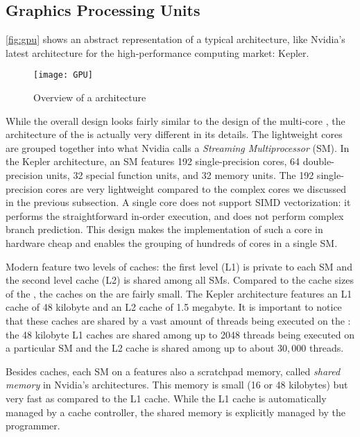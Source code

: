 \subsection[Graphics Processing Units (GPUs)]{Graphics Processing Units}
\autoref{fig:gpu} shows an abstract representation of a typical \GPU architecture, like Nvidia's latest \GPU architecture for the high-performance computing market: Kepler.
\begin{figure}
  \centering
  \texttt{[image: GPU]}
  \caption{Overview of a \GPU architecture}
  \label{fig:gpu}
\end{figure}
While the overall design looks fairly similar to the design of the multi-core \CPU, the architecture of the \GPU is actually very different in its details.
The lightweight \GPU cores are grouped together into what Nvidia calls a \emph{Streaming Multiprocessor} (SM).
In the Kepler architecture, an SM features 192 single-precision cores, 64 double-precision units, 32 special function units, and 32 memory units.
The 192 single-precision cores are very lightweight compared to the complex \CPU cores we discussed in the previous subsection.
A single \GPU core does not support SIMD vectorization:
it performs the straightforward in-order execution, and does not perform complex branch prediction.
This design makes the implementation of such a core in hardware cheap and enables the grouping of hundreds of cores in a single SM.

Modern \GPUs feature two levels of caches:
the first level (L1) is private to each SM and the second level cache (L2) is shared among all SMs.
Compared to the cache sizes of the \CPU, the caches on the \GPU are fairly small.
The Kepler architecture features an L1 cache of 48 kilobyte and an L2 cache of 1.5 megabyte.
It is important to notice that these caches are shared by a vast amount of threads being executed on the \GPU:
the 48 kilobyte L1 caches are shared among up to 2048 threads being executed on a particular SM and the L2 cache is shared among up to about 30,\,000 threads.

Besides caches, each SM on a \GPU features also a scratchpad memory, called \emph{shared memory} in Nvidia's \GPU architectures.
This memory is small (16 or 48 kilobytes) but very fast as compared to the L1 cache.
While the L1 cache is automatically managed by a cache controller, the shared memory is explicitly managed by the programmer.

